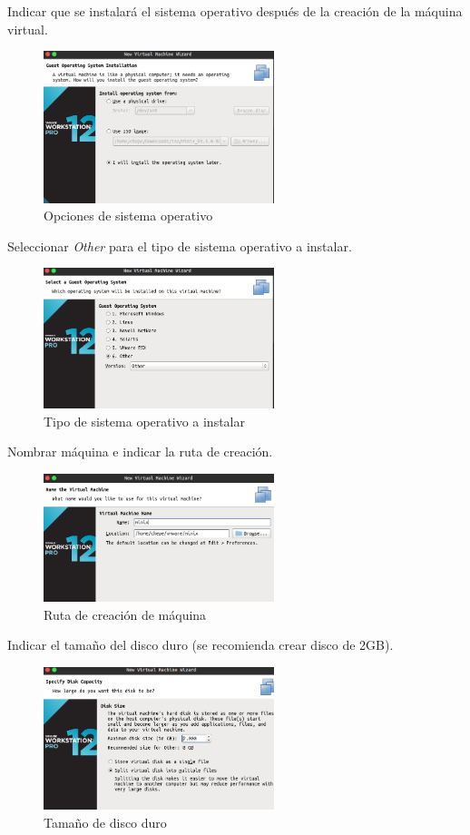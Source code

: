 \documentclass[12pt]{scrartcl}
\begin{document}
Indicar que se instalará el sistema operativo después de la creación de la máquina virtual.
\begin{figure}[H]
  \centering
  \includegraphics[width=0.6\textwidth]{vm/min02.png}
  \caption{Opciones de sistema operativo}
\end{figure}

Seleccionar \textit{Other} para el tipo de sistema operativo a instalar.
\begin{figure}[H]
  \centering
  \includegraphics[width=0.6\textwidth]{vm/min03.png}
  \caption{Tipo de sistema operativo a instalar}
\end{figure}

Nombrar máquina e indicar la ruta de creación.
\begin{figure}[H]
  \centering
  \includegraphics[width=0.6\textwidth]{vm/min04.png}
  \caption{Ruta de creación de máquina}
\end{figure}

Indicar el tamaño del disco duro (se recomienda crear disco de 2GB).
\begin{figure}[H]
  \centering
  \includegraphics[width=0.6\textwidth]{vm/min05.png}
  \caption{Tamaño de disco duro}
\end{figure}
\end{document}
